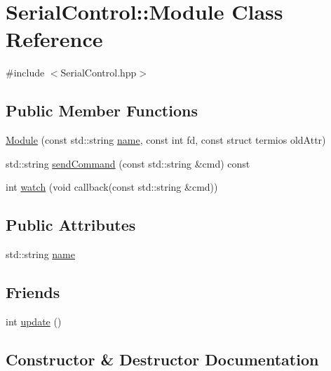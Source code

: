 \hypertarget{classSerialControl_1_1Module}{}\section{Serial\+Control\+::Module Class Reference}
\label{classSerialControl_1_1Module}


{\ttfamily \#include $<$Serial\+Control.\+hpp$>$}

\subsection*{Public Member Functions}
\begin{DoxyCompactItemize}
\item 
\mbox{\hyperlink{classSerialControl_1_1Module_ab8ce49d7a4a18c035a92a09c62d6d377}{Module}} (const std\+::string \mbox{\hyperlink{classSerialControl_1_1Module_a7366c32df408fb367deb22bab7ee0bc5}{name}}, const int fd, const struct termios old\+Attr)
\item 
std\+::string \mbox{\hyperlink{classSerialControl_1_1Module_a173ba39a19dc536e15e03683c5a30081}{send\+Command}} (const std\+::string \&cmd) const
\item 
int \mbox{\hyperlink{classSerialControl_1_1Module_a2f1390a94d7c56d8868a692e8a949c6d}{watch}} (void callback(const std\+::string \&cmd))
\end{DoxyCompactItemize}
\subsection*{Public Attributes}
\begin{DoxyCompactItemize}
\item 
std\+::string \mbox{\hyperlink{classSerialControl_1_1Module_a7366c32df408fb367deb22bab7ee0bc5}{name}}
\end{DoxyCompactItemize}
\subsection*{Friends}
\begin{DoxyCompactItemize}
\item 
int \mbox{\hyperlink{classSerialControl_1_1Module_a49ece8cb08e27584142748fa70eea00b}{update}} ()
\end{DoxyCompactItemize}


\subsection{Constructor \& Destructor Documentation}
\mbox{\label{classSerialControl_1_1Module_ab8ce49d7a4a18c035a92a09c62d6d377}} 
